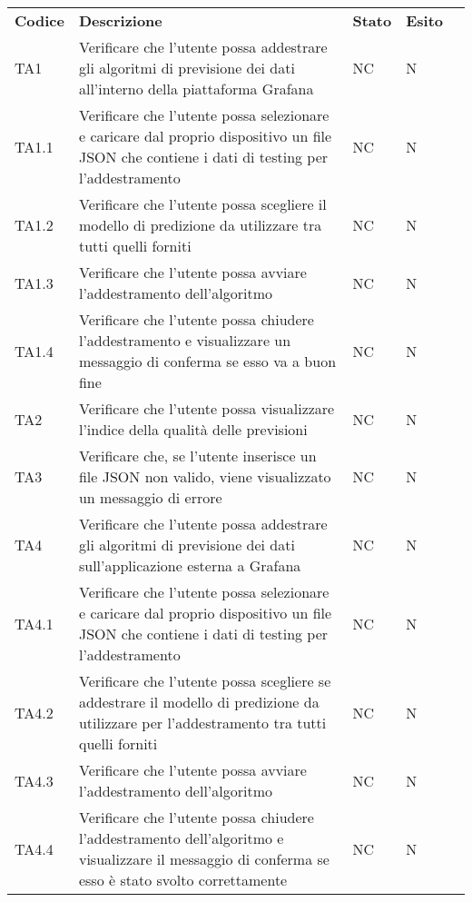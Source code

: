 \begin{longtable} {
		>{\centering}p{15mm} 
		>{\centering}p{79.5mm}
		>{\centering}p{15mm} 
		>{\centering}p{15mm}
		>{}p{0mm}}
	\rowcolor{gray!50}
	\textbf{Codice} & \textbf{Descrizione} & \textbf{Stato} & \textbf{Esito} &\TBstrut \\
	TA1 & Verificare che l'utente possa addestrare gli algoritmi di previsione dei dati all'interno della piattaforma Grafana\glo & NC & N  &\TBstrut \\ [2mm]
	TA1.1 & Verificare che l'utente possa selezionare e caricare dal proprio dispositivo un file JSON che contiene i dati di testing per l'addestramento& NC & N  &\TBstrut \\ [2mm]
	TA1.2 & Verificare che l'utente possa scegliere il modello di predizione da utilizzare tra tutti quelli forniti & NC & N  &\TBstrut \\ [2mm]
	TA1.3 & Verificare che l'utente possa avviare l'addestramento dell'algoritmo & NC & N  &\TBstrut \\ [2mm]
	TA1.4 & Verificare che l'utente possa chiudere l'addestramento e visualizzare un messaggio di conferma se esso va a buon fine & NC & N  &\TBstrut \\ [2mm]
	TA2 & Verificare che l'utente possa visualizzare l'indice della qualità delle previsioni & NC & N  &\TBstrut \\ [2mm]
	TA3 & Verificare che, se l'utente inserisce un file JSON non valido, viene visualizzato un messaggio di errore & NC & N  &\TBstrut \\ [2mm]
	TA4 & Verificare che l'utente possa addestrare gli algoritmi di previsione dei dati sull'applicazione esterna a Grafana\glo & NC & N  &\TBstrut \\ [2mm]
	TA4.1 & Verificare che l'utente possa selezionare e caricare dal proprio dispositivo un file JSON che contiene i dati di testing per l'addestramento & NC & N  &\TBstrut \\ [2mm]
	TA4.2 & Verificare che l'utente possa scegliere se addestrare il modello di predizione da utilizzare per l'addestramento tra tutti quelli forniti & NC & N  &\TBstrut \\ [2mm]
	TA4.3 & Verificare che l'utente possa avviare l'addestramento dell'algoritmo & NC & N  &\TBstrut \\ [2mm]
	TA4.4 & Verificare che l'utente possa chiudere l'addestramento dell'algoritmo e visualizzare il messaggio di conferma se esso è stato svolto correttamente & NC & N  &\TBstrut \\ [2mm]

\end{longtable}
